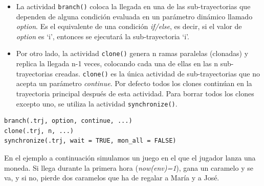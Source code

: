\documentclass[
]{book}
\theoremstyle{definition}
\theoremstyle{definition}
\theoremstyle{definition}
\theoremstyle{definition}
\theoremstyle{remark}
\begin{document}
\begin{itemize}
\item
  La actividad \texttt{branch()} coloca la llegada en una de las sub-trayectorias que dependen de alguna condición evaluada en un parámetro dinámico llamado \emph{option}. Es el equivalente de una condición \emph{if/else}, es decir, si el valor de \emph{option} es `i', entonces se ejecutará la sub-trayectoria `i'.
\item
  Por otro lado, la actividad \texttt{clone()} genera n ramas paralelas (clonadas) y replica la llegada n-1 veces, colocando cada una de ellas en las n sub-trayectorias creadas. \texttt{clone()} es la única actividad de sub-trayectorias que no acepta un parámetro \emph{continue}. Por defecto todos los clones continúan en la trayectoria principal después de esta actividad. Para borrar todos los clones excepto uno, se utiliza la actividad \texttt{synchronize()}.
\end{itemize}

\begin{verbatim}
branch(.trj, option, continue, ...)
clone(.trj, n, ...)
synchronize(.trj, wait = TRUE, mon_all = FALSE)
\end{verbatim}

En el ejemplo a continuación simulamos un juego en el que el jugador lanza una moneda. Si llega durante la primera hora (\emph{now(env)=1}), gana un caramelo y se va, y si no, pierde dos caramelos que ha de regalar a María y a José.
\end{document}
